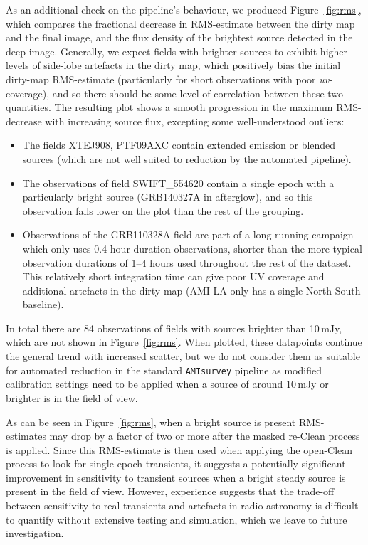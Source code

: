 \documentclass[5p,authoryear]{elsarticle}
\begin{document}
As an additional check on the pipeline's behaviour, we produced Figure~\ref{fig:rms}, which compares the fractional decrease in RMS-estimate between the dirty map and the final image, and the flux density of the brightest source detected in the deep image. 
Generally, we expect fields with brighter sources to exhibit higher levels of side-lobe artefacts in the dirty map, which positively bias the initial dirty-map RMS-estimate (particularly for short observations with poor \textit{uv}-coverage), and so there should be some level of correlation between these two quantities. 
The resulting plot shows a smooth progression in the maximum RMS-decrease with increasing source flux, excepting some well-understood outliers:
\begin{itemize}
   \item The fields XTEJ908, PTF09AXC contain extended emission or blended sources (which are not well suited to reduction by the automated pipeline).
   \item The observations of field SWIFT\_554620 contain a single epoch with a particularly bright source (GRB140327A in afterglow), and so this observation falls lower on the  plot than the rest of the grouping.
   \item Observations of the GRB110328A field are part of a long-running campaign which only uses 0.4 hour-duration observations, shorter than the more typical observation durations of 1--4 hours used throughout the rest of the dataset.
   This relatively short integration time can give poor UV coverage and additional artefacts in the dirty map (AMI-LA only has a single North-South baseline). 
\end{itemize}
In total there are 84 observations of fields with sources brighter than 10\,mJy, which are not shown in Figure~\ref{fig:rms}. 
When plotted, these datapoints continue the general trend with increased scatter, but we do not consider them as suitable for automated reduction in the standard \texttt{AMIsurvey} pipeline as modified calibration settings need to be applied when a source of around 10\,mJy or brighter is in the field of view.

As can be seen in Figure~\ref{fig:rms}, when a bright source is present RMS-estimates may drop by a factor of two or more after the masked re-Clean process is applied. 
Since this RMS-estimate is then used when applying the open-Clean process to look for single-epoch transients, it suggests a potentially significant improvement in sensitivity to transient sources when a bright steady source is present in the field of view. 
However, experience suggests that the trade-off between sensitivity to real transients and artefacts in radio-astronomy is difficult to quantify without extensive testing and simulation, which we leave to future investigation.
\end{document}
